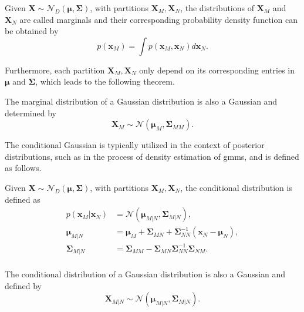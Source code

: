 \documentclass[../../../main.tex]{subfiles}
\begin{document}
\begin{definition}\label{def:marg_gaussian} \cite[p. 177]{dei_2020}
Given $\bm{X} \sim \mathcal{N}_D(\bm{\mu}, \bm{\Sigma})$, with partitions $\bm{X}_M, \bm{X}_N$, the distributions of $\bm{X}_M$ and $\bm{X}_N$ are called marginals and their corresponding probability density function can be obtained by
\begin{equation*}
    p(\bm{x}_M) = \int p(\bm{x}_M,\bm{x}_N)d\bm{x}_N.
\end{equation*}
\end{definition}

Furthermore, each partition $\bm{X}_M, \bm{X}_N$ only depend on its corresponding entries in $\bm{\mu}$ and  $\bm{\Sigma}$, which leads to the following theorem. 

\begin{theorem} \cite[p. 177]{dei_2020}
The marginal distribution of a Gaussian distribution is also a Gaussian and determined by
\begin{equation*}
    \bm{X}_M \sim \mathcal{N}(\bm{\mu}_M, \bm{\Sigma}_{MM}).
\end{equation*}
\end{theorem}

The conditional Gaussian is typically utilized in the context of posterior distributions, such as in the process of density estimation of \acrshort{gmm}s, and is defined as follows.

\begin{definition} \cite[p. 177]{dei_2020}
Given $\bm{X} \sim \mathcal{N}_D(\bm{\mu}, \bm{\Sigma})$, with partitions $\bm{X}_M, \bm{X}_N$, the conditional distribution is defined as
\begin{align*}
    p(\bm{x}_M | \bm{x}_N) &= \mathcal{N}(\bm{\mu}_{M | N}, \bm{\Sigma}_{M | N}), \\
    \bm{\mu}_{M | N} &= \bm{\mu}_M + \bm{\Sigma}_{M N} + \bm{\Sigma}^{-1}_{N N}(\bm{x}_N - \bm{\mu}_N),\\
    \bm{\Sigma}_{M | N} &= \bm{\Sigma}_{M M} - \bm{\Sigma}_{M N} \bm{\Sigma}^{-1}_{N N}\bm{\Sigma}_{N M}.\\
\end{align*}
\end{definition}

\begin{theorem} \cite[p. 177]{dei_2020}
The conditional distribution of a Gaussian distribution is also a Gaussian and defined by 
\begin{equation*}
    \bm{X}_{M | N} \sim \mathcal{N}(\bm{\mu}_{M | N}, \bm{\Sigma}_{M | N}).
\end{equation*}
\end{theorem}
\end{document}
